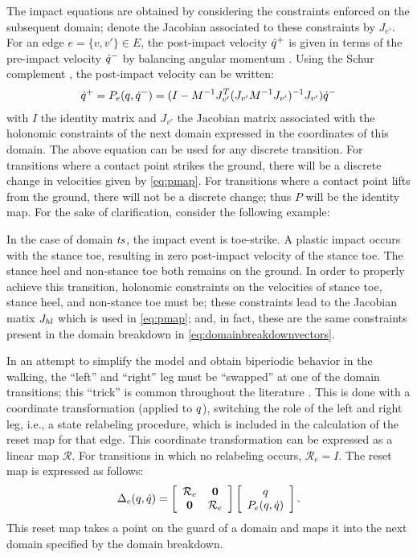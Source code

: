 The impact equations are obtained by considering the constraints enforced on the
subsequent domain;
%
denote the Jacobian associated to these constraints by $J_{e'}$.
%
For an edge $e = \{v, v'\} \in E$, the post-impact velocity $\dot{q}^{+}$ is given in
terms of the pre-impact velocity $\dot{q}^{-}$ by balancing angular momentum
\cite{Hurmuzlu1994}.
%
Using the Schur complement \cite{Zhang2005}, the post-impact velocity can be
written:
%
\begin{align}
  \label{eq:pmap}
  \dot{q}^{+} = P_{e}(q, \dot{q}^{-}) = (I - M^{-1} J_{v'}^T(J_{v'} M^{-1}
  J_{v'})^{-1} J_{v'})\dot{q}^{-}
\end{align}
%
with $I$ the identity matrix and $J_{v'}$ the Jacobian matrix associated with
the holonomic constraints of the next domain expressed in the coordinates of
this domain.
%
The above equation can be used for any discrete transition.
%
For transitions where a contact point strikes the ground, there will be a
discrete change in velocities given by \eqref{eq:pmap}.
%
For transitions where a contact point lifts from the ground, there will not be a
discrete change;
%
thus $P$ will be the identity map.
%
For the sake of clarification, consider the following example:
%
\begin{exmp}
  In the case of domain $\mathit{ts}$, the impact event is toe-strike.
  A plastic impact occurs with the stance toe, resulting in zero post-impact
  velocity of the stance toe.
  The stance heel and non-stance toe both remains on the ground.
  In order to properly achieve this transition, holonomic constraints on the
  velocities of stance toe, stance heel, and non-stance toe must be;
  these constraints lead to the Jacobian matix $J_{\mathit{hl}}$ which is used in
  \eqref{eq:pmap};
  and, in fact, these are the same constraints present in the domain breakdown
  in \eqref{eq:domainbreakdownvectors}.
\end{exmp}

In an attempt to simplify the model and obtain biperiodic behavior in the
walking, the ``left'' and ``right'' leg must be ``swapped'' at one of the domain
transitions;
%
this ``trick'' is common throughout the literature \cite{Grizzle2001}.
%
This is done with a coordinate transformation (applied to $q$), switching the
role of the left and right leg, i.e., a state relabeling procedure, which is
included in the calculation of the reset map for that edge.
%
This coordinate transformation can be expressed as a linear map $\mathcal{R}$.
%
For transitions in which no relabeling occurs, $\mathcal{R}_{e} = I$.
%
The reset map is expressed as follows:
%
\begin{align*}
  \Delta_{e}(q, \dot{q}) =
  \left[ \begin{array}{c c}
      \mathcal{R}_{e} & {\mathbf 0}\\
      {\mathbf 0} & \mathcal{R}_{e}
    \end{array} \right]
  \left[ \begin{array}{c}
      q\\
      P_{e}(q, \dot{q})
    \end{array} \right].
\end{align*}
%
This reset map takes a point on the guard of a domain and maps it into the next
domain specified by the domain breakdown.

